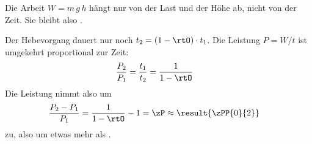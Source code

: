 Die Arbeit $W = m\,g\,h$ hängt nur von der Last und der Höhe ab, nicht von der Zeit. Sie bleibt also .

Der Hebevorgang dauert nur noch $t_2 = \left(1-\rtO\right)\cdot t_1$. Die Leistung $P = W/t$ ist umgekehrt proportional zur Zeit:
\begin{align}
 \frac{P_2}{P_1} &= \frac{t_1}{t_2} = \frac{1}{1-\rtO}
\end{align}
Die Leistung nimmt also um
\begin{align}
 \frac{P_2-P_1}{P_1} &= \frac{1}{1-\rtO}-1 = \zP \approx \result{\zPP{0}{2}}
\end{align}
zu, also um etwas mehr als \rtO.
